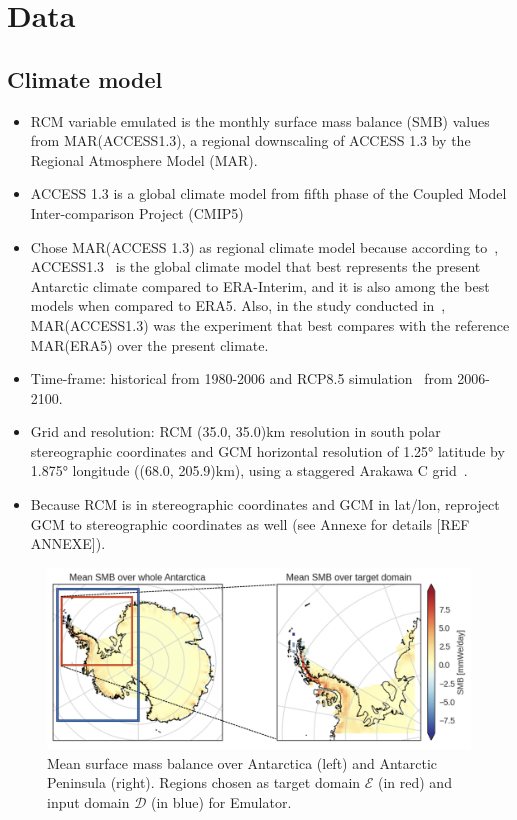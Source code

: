 \documentclass[a4paper,11pt,oneside]{report}
\begin{document}
\section{Data}\label{sec:data}
\subsection{Climate model}
\begin{itemize}
    \item RCM variable emulated is the monthly surface mass balance (SMB) values from MAR(ACCESS1.3), a regional downscaling of ACCESS 1.3 by the Regional Atmosphere Model (MAR). 
    \item ACCESS 1.3 is a global climate model from fifth phase of the Coupled Model Inter-comparison Project (CMIP5)
    \item Chose MAR(ACCESS 1.3) as regional climate model because according to~\cite{Kittel, Agosta2015}, ACCESS1.3~\cite{ACCESS13} is the global climate model that best represents the present Antarctic climate compared to ERA-Interim, and it is also among the best models when compared to ERA5. Also, in the study conducted in~\cite{Kittel}, MAR(ACCESS1.3) was the experiment that best compares with the reference MAR(ERA5) over the present climate. 
    \item Time-frame: historical from 1980-2006 and RCP8.5 simulation~\cite{Moss2010} from 2006-2100. 
    \item Grid and resolution: RCM (35.0, 35.0)km resolution in south polar stereographic coordinates and GCM horizontal resolution of 1.25° latitude by 1.875° longitude ((68.0, 205.9)km), using a staggered Arakawa C grid~\cite{ACCESS13, ACCESS13_2}. 
    \item Because RCM is in stereographic coordinates and GCM in lat/lon, reproject GCM to stereographic coordinates as well (see Annexe for details [REF ANNEXE]). 
\end{itemize}

\begin{figure}[!t]
  \centering
  \includegraphics[width=\columnwidth]{images/domains.png}
  \caption []{\small Mean surface mass balance over Antarctica (left) and Antarctic Peninsula (right). Regions chosen as target domain $\mathcal{E}$ (in red) and input domain $\mathcal{D}$ (in blue) for Emulator. }
  \vspace{-3mm}
    \label{fig:region-of-choice}
\end{figure}
\end{document}
